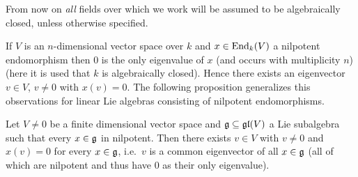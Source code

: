 From now on \emph{all} fields over which we work will be assumed to be algebraically closed, unless otherwise specified.


If $V$ is an $n$-dimensional vector space over $k$ and $x \in \operatorname{End}_k(V)$ a nilpotent endomorphism then $0$ is the only eigenvalue of $x$ (and occurs with multiplicity $n$) (here it is used that $k$ is algebraically closed). Hence there exists an eigenvector $v \in V$, $v \neq 0$ with $x(v) = 0$. The following proposition generalizes this observations for linear Lie algebras consisting of nilpotent endomorphisms.


\begin{prop}\label{prop: common eigenvector for nilpotent Lie algebras}
 Let $V \neq 0$ be a finite dimensional vector space and $\mathfrak{g} \subseteq \mathfrak{gl}(V)$ a Lie subalgebra such that every $x \in \mathfrak{g}$ in nilpotent. Then there exists $v \in V$ with $v \neq 0$ and $x(v) = 0$ for every $x \in \mathfrak{g}$, i.e.\ $v$ is a common eigenvector of all $x \in \mathfrak{g}$ (all of which are nilpotent and thus have $0$ as their only eigenvalue).
\end{prop}
